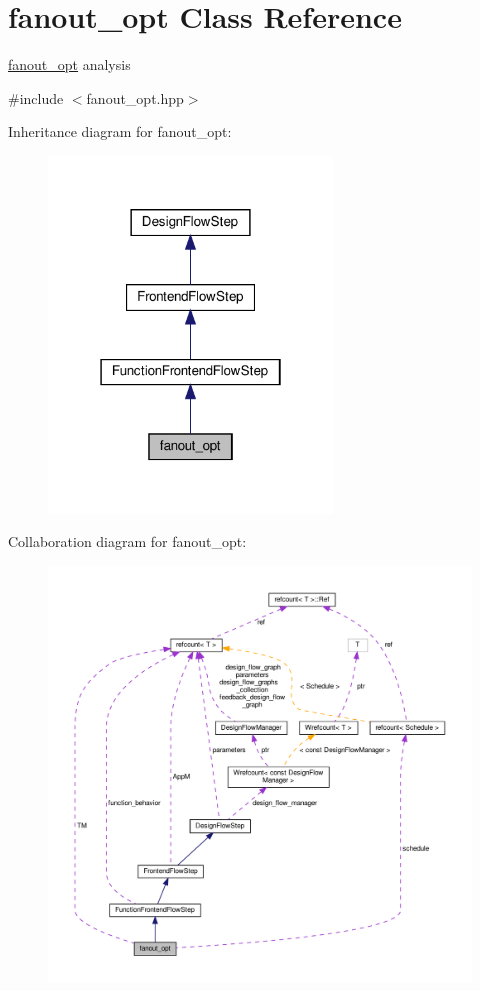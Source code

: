 \hypertarget{classfanout__opt}{}\section{fanout\+\_\+opt Class Reference}
\label{classfanout__opt}


\hyperlink{classfanout__opt}{fanout\+\_\+opt} analysis  




{\ttfamily \#include $<$fanout\+\_\+opt.\+hpp$>$}



Inheritance diagram for fanout\+\_\+opt\+:
\nopagebreak
\begin{figure}[H]
\begin{center}
\leavevmode
\includegraphics[width=214pt]{d1/dd9/classfanout__opt__inherit__graph}
\end{center}
\end{figure}


Collaboration diagram for fanout\+\_\+opt\+:
\nopagebreak
\begin{figure}[H]
\begin{center}
\leavevmode
\includegraphics[width=350pt]{d4/deb/classfanout__opt__coll__graph}
\end{center}
\end{figure}
